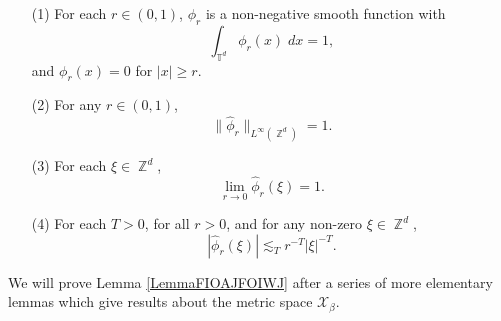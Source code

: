 \documentclass[dvipsnames,letterpaper,12pt]{article}
\numberwithin{equation}{section}
\DeclareMathOperator{\ZZ}{\mathbb{Z}}
\DeclareMathOperator{\TT}{\mathbb{T}}
\numberwithin{theorem}{section}
\begin{document}
\begin{enumerate}
    \item[(1)] For each $r \in (0,1)$, $\phi_r$ is a non-negative smooth function with
    \begin{equation}
        \int_{\TT^d} \phi_r(x)\; dx = 1,
    \end{equation}
    and $\phi_r(x) = 0$ for $|x| \geq r$.

    \item[(2)] For any $r \in (0,1)$,
    \begin{equation} \label{equationDIOJAOIJVIV23242}
        \big\| \widehat{\phi}_r \big\|_{L^\infty(\ZZ^d)} = 1.
    \end{equation}


    \item[(3)] For each $\xi \in \ZZ^d$,
    \begin{equation} \label{approximationtoidentitypointwiseconvergence}
        \lim_{r \to 0} \widehat{\phi}_r(\xi) = 1.
    \end{equation}

    \item[(4)] For each $T > 0$, for all $r > 0$, and for any non-zero $\xi \in \ZZ^d$,
    \begin{equation} \label{molificationdecaybound}
        |\widehat{\phi}_r(\xi)| \lesssim_T r^{-T} |\xi|^{-T}.
    \end{equation}
\end{enumerate}
%
We will prove Lemma \ref{LemmaFIOAJFOIWJ} after a series of more elementary lemmas which give results about the metric space $\mathcal{X}_\beta$.
\end{document}
